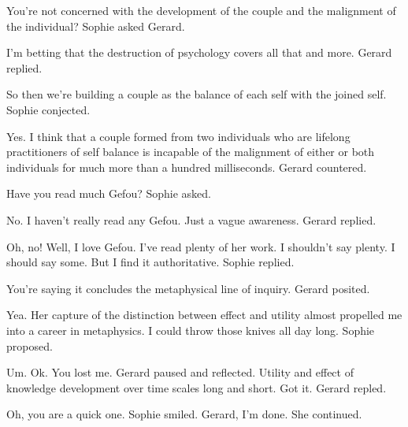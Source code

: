 

You're not concerned with the development of the couple and the
malignment of the individual?  Sophie asked Gerard.

I'm betting that the destruction of psychology covers all that and
more.  Gerard replied.

So then we're building a couple as the balance of each self with the
joined self.  Sophie conjected.

Yes.  I think that a couple formed from two individuals who are
lifelong practitioners of self balance is incapable of the malignment
of either or both individuals for much more than a hundred
milliseconds.  Gerard countered.

Have you read much Gefou?  Sophie asked.

No.  I haven't really read any Gefou.  Just a vague awareness.  Gerard
replied.

Oh, no!  Well, I love Gefou.  I've read plenty of her work.  I
shouldn't say plenty.  I should say some.  But I find it
authoritative.  Sophie replied.

You're saying it concludes the metaphysical line of inquiry.  Gerard
posited.

Yea.  Her capture of the distinction between effect and utility almost
propelled me into a career in metaphysics.  I could throw those knives
all day long.  Sophie proposed.

Um.  Ok.  You lost me.  Gerard paused and reflected.  Utility and
effect of knowledge development over time scales long and short.  Got
it.  Gerard repled.

Oh, you are a quick one.  Sophie smiled.  Gerard, I'm done.  She
continued.

\bye
